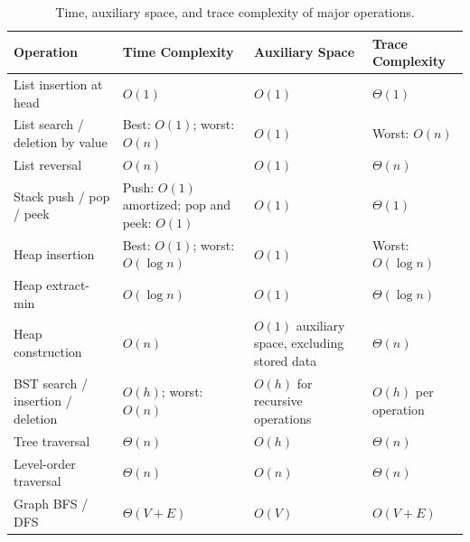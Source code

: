 \documentclass[11pt,a4paper]{article}
\renewcommand{\arraystretch}{1.06}
\begin{document}
\begin{table}[htbp]
\centering
\small
\renewcommand{\arraystretch}{1.2}
\setlength{\tabcolsep}{5pt}

\begin{tabularx}{\textwidth}{
    @{}
    >{\raggedright\arraybackslash}p{2.8cm}
    >{\raggedright\arraybackslash}p{4.0cm}
    >{\centering\arraybackslash}p{2.2cm}
    >{\centering\arraybackslash}X
    @{}
}
\toprule
\textbf{Operation} &
\textbf{Time Complexity} &
\textbf{Auxiliary Space} &
\textbf{Trace Complexity} \\
\midrule

List insertion at head
& $O(1)$
& $O(1)$
& $\Theta(1)$ \\
\hline

List search / deletion by value
& Best: $O(1)$; worst: $O(n)$
& $O(1)$
& Worst: $O(n)$ \\
\hline

List reversal
& $O(n)$
& $O(1)$
& $\Theta(n)$ \\
\hline

Stack push / pop / peek
& Push: $O(1)$ amortized; pop and peek: $O(1)$
& $O(1)$
& $\Theta(1)$ \\
\hline

Heap insertion
& Best: $O(1)$; worst: $O(\log n)$
& $O(1)$
& Worst: $O(\log n)$ \\
\hline

Heap extract-min
& $O(\log n)$
& $O(1)$
& $\Theta(\log n)$ \\
\hline

Heap construction
& $O(n)$
& $O(1)$ auxiliary space, excluding stored data
& $\Theta(n)$ \\
\hline

BST search / insertion / deletion
& $O(h)$; worst: $O(n)$
& $O(h)$ for recursive operations
& $O(h)$ per operation \\
\hline

Tree traversal
& $\Theta(n)$
& $O(h)$
& $\Theta(n)$ \\
\hline

Level-order traversal
& $\Theta(n)$
& $O(n)$
& $\Theta(n)$ \\
\hline

Graph BFS / DFS
& $\Theta(V+E)$
& $O(V)$
& $O(V+E)$ \\

\bottomrule
\end{tabularx}

\caption{Time, auxiliary space, and trace complexity of major operations.}
\label{tab:complexity}
\end{table}
\end{document}
